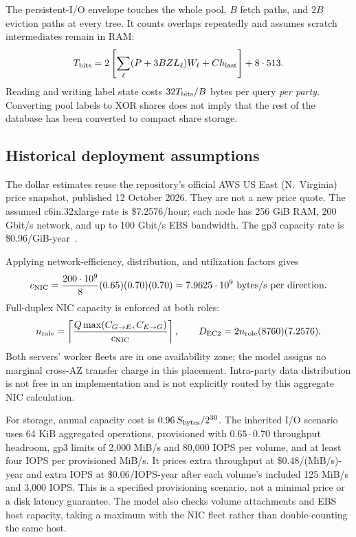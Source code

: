 \documentclass[11pt]{article}
\newcommand{\ceil}[1]{\left\lceil #1\right\rceil}
\begin{document}
The persistent-I/O envelope touches the whole pool, $B$ fetch paths, and
$2B$ eviction paths at every tree. It counts overlaps repeatedly and assumes
scratch intermediates remain in RAM:
\begin{equation}
 T_{\rm bits}=2\left[\sum_\ell(P+3BZL_\ell)W_\ell+C h_{\rm last}\right]
            +8\cdot513.
\end{equation}
Reading and writing label state costs $32T_{\rm bits}/B$ bytes per query
\emph{per party}. Converting pool labels to XOR shares does not imply that
the rest of the database has been converted to compact share storage.

\subsection{Historical deployment assumptions}
The dollar estimates reuse the repository's official AWS US East
(N.~Virginia) price snapshot, published 12 October 2026. They are not a new
price quote. The assumed c6in.32xlarge rate is \$7.2576/hour; each node has
256 GiB RAM, 200 Gbit/s network, and up to 100 Gbit/s EBS bandwidth.
The gp3 capacity rate is \$0.96/GiB-year~\cite{awsnetwork,awsebs,awsprice}.

Applying network-efficiency, distribution, and utilization factors gives
\begin{equation}
 c_{\rm NIC}=\frac{200\cdot10^9}{8}(0.65)(0.70)(0.70)
            =7.9625\cdot10^9\ \text{bytes/s per direction}.
\end{equation}
Full-duplex NIC capacity is enforced at both roles:
\begin{equation}
 n_{\rm role}=\ceil{\frac{Q\max(C_{G\to E},C_{E\to G})}{c_{\rm NIC}}},
 \qquad D_{\rm EC2}=2n_{\rm role}(8760)(7.2576).
\end{equation}
Both servers' worker fleets are in one availability zone; the model assigns
no marginal cross-AZ transfer charge in this placement. Intra-party data
distribution is not free in an implementation and is not explicitly routed
by this aggregate NIC calculation.

For storage, annual capacity cost is
$0.96\,S_{\rm bytes}/2^{30}$. The inherited I/O scenario uses 64 KiB aggregated
operations, provisioned with $0.65\cdot0.70$ throughput headroom, gp3 limits
of 2,000 MiB/s and 80,000 IOPS per volume, and at least four IOPS per provisioned
MiB/s. It prices extra throughput at \$0.48/(MiB/s)-year and extra IOPS at
\$0.06/IOPS-year after each volume's included 125 MiB/s and 3,000 IOPS.
This is a specified provisioning scenario, not a minimal price or a disk
latency guarantee. The model also checks volume attachments and EBS host
capacity, taking a maximum with the NIC fleet rather than double-counting
the same host.
\end{document}
